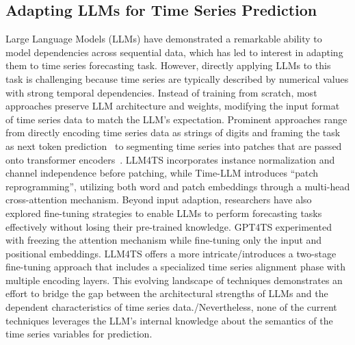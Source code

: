 \documentclass[conference]{IEEEtran}
\begin{document}
\subsection{Adapting LLMs for Time Series Prediction} Large Language Models (LLMs) have demonstrated a remarkable ability to model dependencies across sequential data, which has led to interest in adapting them to time series forecasting task. However, directly applying LLMs to this task is challenging because time series are typically described by numerical values with strong temporal dependencies. Instead of training from scratch, most approaches preserve LLM architecture and weights, modifying the input format of time series data to match the LLM's expectation. Prominent approaches range from directly encoding time series data as strings of digits and framing the task as next token prediction~\cite{gruver2024largelanguagemodelszeroshot} to segmenting time series into patches that are passed onto transformer encoders~\cite{li2024llm4ts,zhou2023fitsallpowergeneraltime, jin2024timellmtimeseriesforecasting}. LLM4TS \cite{li2024llm4ts} incorporates instance normalization and channel independence before patching, while Time-LLM \cite{jin2024timellmtimeseriesforecasting} introduces ``patch reprogramming'', utilizing both word and patch embeddings through a multi-head cross-attention mechanism.
Beyond input adaption, researchers have also explored fine-tuning strategies to enable LLMs to perform forecasting tasks effectively without losing their pre-trained knowledge. GPT4TS \cite{zhou2023fitsallpowergeneraltime} experimented with freezing the attention mechanism while fine-tuning only the input and positional embeddings. LLM4TS \cite{li2024llm4ts} offers a more intricate/introduces a two-stage fine-tuning approach that includes a specialized time series alignment phase with multiple encoding layers. This evolving landscape of techniques demonstrates an effort to bridge the gap between the architectural strengths of LLMs and the dependent characteristics of time series data./Nevertheless, none of the current techniques leverages the LLM's internal knowledge about the semantics of the time series variables for prediction.
\end{document}
